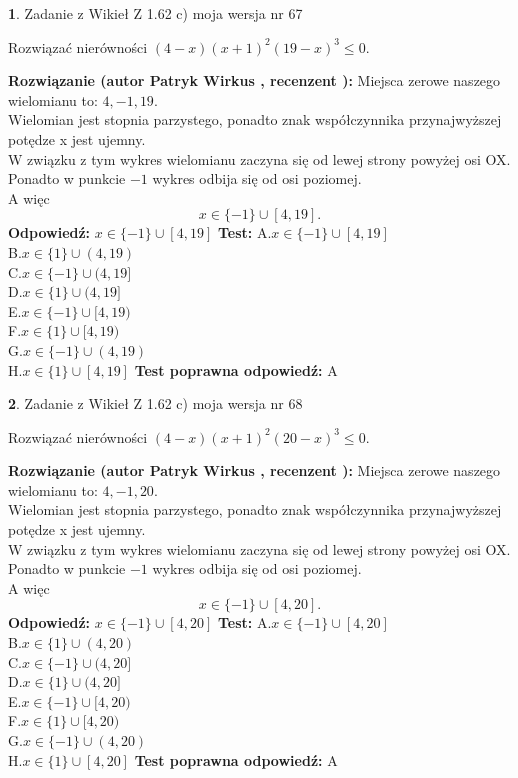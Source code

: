 \documentclass[12pt, a4paper]{article}
\theoremstyle{definition} %
\newtheorem{zad}{}
\newcommand{\zadStart}[1]{\begin{zad}#1\newline}
\newcommand{\zadStop}{\end{zad}}
\newcommand{\rozwStart}[2]{\noindent \textbf{Rozwiązanie (autor #1 , recenzent #2): }\newline}
\newcommand{\rozwStop}{\newline}
\newcommand{\odpStart}{\noindent \textbf{Odpowiedź:}\newline}
\newcommand{\odpStop}{\newline}
\newcommand{\testStart}{\noindent \textbf{Test:}\newline}
\newcommand{\testStop}{\newline}
\newcommand{\kluczStart}{\noindent \textbf{Test poprawna odpowiedź:}\newline}
\newcommand{\kluczStop}{\newline}
\begin{document}
\zadStart{Zadanie z Wikieł Z 1.62 c) moja wersja nr 67}

Rozwiązać nierówności $(4-x)(x+1)^{2}(19-x)^{3}\le0$.
\zadStop
\rozwStart{Patryk Wirkus}{}
Miejsca zerowe naszego wielomianu to: $4, -1, 19$.\\
Wielomian jest stopnia parzystego, ponadto znak współczynnika przy\linebreak najwyższej potędze x jest ujemny.\\ W związku z tym wykres wielomianu zaczyna się od lewej strony powyżej osi OX.\\
Ponadto w punkcie $-1$ wykres odbija się od osi poziomej.\\
A więc $$x \in \{-1\} \cup [4,19].$$
\rozwStop
\odpStart
$x \in \{-1\} \cup [4,19]$
\odpStop
\testStart
A.$x \in \{-1\} \cup [4,19]$\\
B.$x \in \{1\} \cup (4,19)$\\
C.$x \in \{-1\} \cup (4,19]$\\
D.$x \in \{1\} \cup (4,19]$\\
E.$x \in \{-1\} \cup [4,19)$\\
F.$x \in \{1\} \cup [4,19)$\\
G.$x \in \{-1\} \cup (4,19)$\\
H.$x \in \{1\} \cup [4,19]$
\testStop
\kluczStart
A
\kluczStop



\zadStart{Zadanie z Wikieł Z 1.62 c) moja wersja nr 68}

Rozwiązać nierówności $(4-x)(x+1)^{2}(20-x)^{3}\le0$.
\zadStop
\rozwStart{Patryk Wirkus}{}
Miejsca zerowe naszego wielomianu to: $4, -1, 20$.\\
Wielomian jest stopnia parzystego, ponadto znak współczynnika przy\linebreak najwyższej potędze x jest ujemny.\\ W związku z tym wykres wielomianu zaczyna się od lewej strony powyżej osi OX.\\
Ponadto w punkcie $-1$ wykres odbija się od osi poziomej.\\
A więc $$x \in \{-1\} \cup [4,20].$$
\rozwStop
\odpStart
$x \in \{-1\} \cup [4,20]$
\odpStop
\testStart
A.$x \in \{-1\} \cup [4,20]$\\
B.$x \in \{1\} \cup (4,20)$\\
C.$x \in \{-1\} \cup (4,20]$\\
D.$x \in \{1\} \cup (4,20]$\\
E.$x \in \{-1\} \cup [4,20)$\\
F.$x \in \{1\} \cup [4,20)$\\
G.$x \in \{-1\} \cup (4,20)$\\
H.$x \in \{1\} \cup [4,20]$
\testStop
\kluczStart
A
\kluczStop
\end{document}
